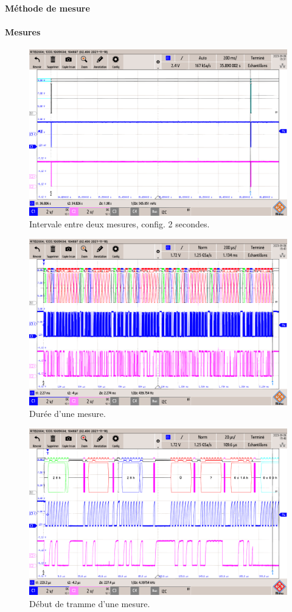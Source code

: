 \paragraph{Méthode de mesure}
\paragraph{Mesures}

\begin{figure}[!h]
	\centering
	\includegraphics[width=0.7\linewidth]{../figures/mesures/I2C/Intervale-2s}
	\caption{Intervale entre deux mesures, config. 2 secondes.}
	\label{fig:intervale-2s}
\end{figure}

\begin{figure}[!h]
	\centering
	\includegraphics[width=0.7\linewidth]{../figures/mesures/I2C/duree-comm}
	\caption{Durée d'une mesure.}
	\label{fig:duree-comm}
\end{figure}

\begin{figure}[!h]
	\centering
	\includegraphics[width=0.7\linewidth]{../figures/mesures/I2C/Tramme-mesure}
	\caption{Début de tramme d'une mesure.}
	\label{fig:tramme-mesure}
\end{figure}

